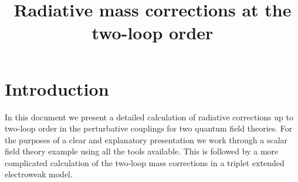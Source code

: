 \documentclass[11pt]{article}
\begin{document}
\title{Radiative mass corrections at the two-loop order}
\maketitle
\tableofcontents

\section{Introduction}

In this document we present a detailed calculation of radiative corrections up to two-loop order in the perturbative couplings for two quantum field theories.  For the purposes of a clear and explanatory presentation we work through a scalar field theory example using all the tools available.  This is followed by a more complicated calculation of the two-loop mass corrections in a triplet extended electroweak model.\\
\end{document}

